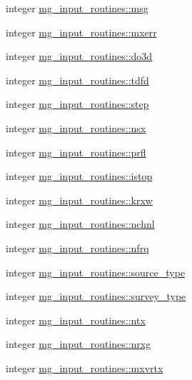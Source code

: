 \begin{DoxyCompactItemize}
\item 
integer \hyperlink{namespacemg__input__routines_a6485fb3eba9b87bb80aaac69bb342695}{mg\+\_\+input\+\_\+routines\+::msg}
\item 
integer \hyperlink{namespacemg__input__routines_a079d18c936f009ac6113cc598db36422}{mg\+\_\+input\+\_\+routines\+::mxerr}
\item 
integer \hyperlink{namespacemg__input__routines_abccc4c4d25850b657fcca7f97c1e6059}{mg\+\_\+input\+\_\+routines\+::do3d}
\item 
integer \hyperlink{namespacemg__input__routines_aa14409c0d31135d57aeebe18372c39f0}{mg\+\_\+input\+\_\+routines\+::tdfd}
\item 
integer \hyperlink{namespacemg__input__routines_a60b46446ed51344037d5a78ec02b800d}{mg\+\_\+input\+\_\+routines\+::step}
\item 
integer \hyperlink{namespacemg__input__routines_a93ce77d2c22f2c7c842adeed015927ab}{mg\+\_\+input\+\_\+routines\+::nsx}
\item 
integer \hyperlink{namespacemg__input__routines_a8b4df2339b6d8cbb2d403d9ec0966b14}{mg\+\_\+input\+\_\+routines\+::prfl}
\item 
integer \hyperlink{namespacemg__input__routines_a7d3adc6f4d1d09319400a6a90b644ccf}{mg\+\_\+input\+\_\+routines\+::istop}
\item 
integer \hyperlink{namespacemg__input__routines_a689c313caea9666b0564a35579678ce1}{mg\+\_\+input\+\_\+routines\+::krxw}
\item 
integer \hyperlink{namespacemg__input__routines_a29d81574f8ee97737139da90c94a3614}{mg\+\_\+input\+\_\+routines\+::nchnl}
\item 
integer \hyperlink{namespacemg__input__routines_ae01275ae75f29d76acacfc4e14d6ec15}{mg\+\_\+input\+\_\+routines\+::nfrq}
\item 
integer \hyperlink{namespacemg__input__routines_a449e5666c46949916131dbae4eb535b5}{mg\+\_\+input\+\_\+routines\+::source\+\_\+type}
\item 
integer \hyperlink{namespacemg__input__routines_a60b4086f2db3ca8019664ea74b1db69d}{mg\+\_\+input\+\_\+routines\+::survey\+\_\+type}
\item 
integer \hyperlink{namespacemg__input__routines_aeb83e13c812c869ae5938a20ba9d42f0}{mg\+\_\+input\+\_\+routines\+::ntx}
\item 
integer \hyperlink{namespacemg__input__routines_a36dfcbd701ff9315360ade221113c526}{mg\+\_\+input\+\_\+routines\+::nrxg}
\item 
integer \hyperlink{namespacemg__input__routines_ad7f27d4e899695dc12c5b45ea797b177}{mg\+\_\+input\+\_\+routines\+::mxvrtx}

\end{DoxyCompactItemize}
